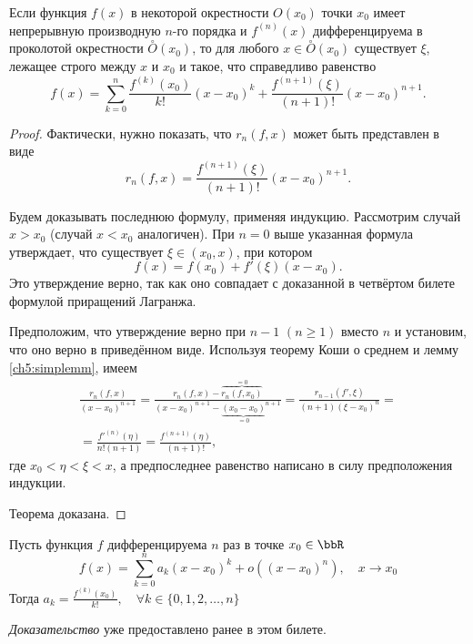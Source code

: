 \begin{thm}
Если функция $f(x)$ в некоторой окрестности $O(x_0)$ точки $x_0$ имеет непрерывную производную $n$-го порядка и $f^{(n)}(x)$ дифференцируема в проколотой окрестности $\overset{\circ}{O}(x_0)$, то для любого
$x \in \overset{\circ}{O}(x_0)$ существует $\xi$, лежащее строго между $x$ и $x_0$ и такое, что справедливо равенство
\begin{equation}
f(x) = \sum_{k = 0}^{n} \frac{f^{(k)}(x_0)}{k!}(x - x_0)^k + \frac{f^{(n + 1)}(\xi)}{(n + 1)!}(x - x_0)^{n + 1}.
\end{equation}
\end{thm}

\begin{proof}
Фактически, нужно показать, что $r_n(f,x)$ может быть представлен в виде
$$
r_n(f,x) = \frac{f^{(n + 1)}(\xi)}{(n + 1)!}(x - x_0)^{n + 1}.
$$

Будем доказывать последнюю формулу, применяя индукцию. Рассмотрим случай $x>x_0$ (случай $x<x_0$ аналогичен). При $n=0$ выше указанная формула утверждает, что существует $\xi\in(x_0,x)$, при котором
$$
f(x) = f(x_0) + f'(\xi)(x-x_0).
$$
Это утверждение верно, так как оно совпадает с доказанной в четвёртом билете формулой приращений Лагранжа.

Предположим, что утверждение верно при $n-1$ $(n \ge 1)$ вместо $n$ и установим, что оно верно в приведённом виде. Используя теорему Коши о среднем и лемму \ref{ch5:simplemm}, имеем
\begin{multline*}
\frac{r_n(f,x)}{(x-x_0)^{n+1}} = \frac{r_n(f,x) - \overbrace{r_n(f,x_0)}^{=0}}{(x-x_0)^{n+1} - {\underbrace{(x_0-x_0)}_{=0}}^{n+1}} = \frac{r_{n-1}(f',\xi)}{(n+1)(\xi-x_0)^{n}} =\\ 
= \frac{{f'}^{(n)} (\eta)}{n!(n+1)} =  \frac{{f}^{(n+1)} (\eta)}{(n+1)!},
\end{multline*}
где $x_0<\eta<\xi<x$, а предпоследнее равенство написано в силу предположения индукции.

Теорема доказана.
\end{proof}


\begin{thm}
Пусть функция $f$ дифференцируема $n$ раз в точке $x_0 \in \bbR$
\begin{equation}
f(x) = \sum_{k = 0}^{n}a_k (x - x_0)^k + o((x - x_0)^n), \quad x \to x_0 
\end{equation}
Тогда $a_k = \frac{f^{(k)}(x_0)}{k!}, \quad \forall k \in \{0, 1, 2, \ldots,n\}$
\end{thm}

\textit{Доказательство} уже предоставлено ранее в этом билете.
